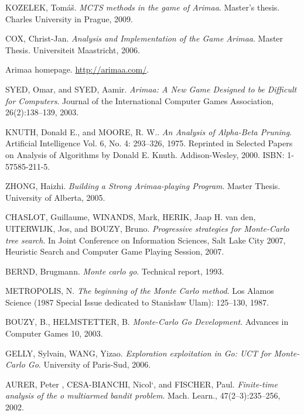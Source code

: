 \def\bibname{Literature}
\begin{thebibliography}{99}
\addcontentsline{toc}{chapter}{\bibname}

	{\sc KOZELEK,} Tomáš.
	\emph{MCTS methods in the game of Arimaa}.
	Master's thesis.
	Charles University in Prague, 2009.

	{\sc COX,} Christ-Jan.
	\emph{Analysis and Implementation of the Game Arimaa}.
	Master Thesis.
	Universiteit Maastricht, 2006.

	Arimaa homepage.
	\url{http://arimaa.com/}.

	{\sc SYED,} Omar, and {\sc SYED,} Aamir.
	\emph{Arimaa: A New Game Designed to be Difficult for Computers}.
	Journal of the International Computer Games Association, 26(2):138--139, 2003.

	{\sc KNUTH,} Donald E., and {\sc MOORE,} R. W..
	\emph{An Analysis of Alpha-Beta Pruning}.
	Artificial Intelligence Vol. 6, No. 4: 293--326, 1975. Reprinted in Selected
	Papers on Analysis of Algorithms by Donald E. Knuth. Addison-Wesley, 2000.
	ISBN: 1-57585-211-5.

	{\sc ZHONG,} Haizhi.
	\emph{Building a Strong Arimaa-playing Program}.
	Master Thesis.
	University of Alberta, 2005.

	{\sc CHASLOT,} Guillaume, {\sc WINANDS,} Mark, {\sc HERIK,} Jaap H. van den,
	{\sc UITERWIJK,} Jos, and {\sc BOUZY,} Bruno.
	\emph{Progressive strategies for Monte-Carlo tree search}.
	In Joint Conference on Information Sciences, Salt Lake City 2007, Heuristic
	Search and Computer Game Playing Session, 2007.

	{\sc BERND,} Brugmann.
	\emph{Monte carlo go}.
	Technical report, 1993.

	{\sc METROPOLIS,} N.
	\emph{The beginning of the Monte Carlo method}.
	Los Alamos Science (1987 Special Issue dedicated to Stanisław Ulam):
	125--130, 1987.

	{\sc BOUZY,} B., {\sc HELMSTETTER,} B.
	\emph{Monte-Carlo Go Development}.
	Advances in Computer Games 10, 2003.

	{\sc GELLY,} Sylvain, {\sc WANG,} Yizao.
	\emph{Exploration exploitation in Go: UCT for Monte-Carlo Go}.
	University of Paris-Sud, 2006.

	{\sc AURER,} Peter , {\sc CESA-BIANCHI,} Nicol`, and {\sc FISCHER,} Paul.
	\emph{Finite-time analysis of the o multiarmed bandit problem}.
	Mach. Learn., 47(2--3):235--256, 2002.


\end{thebibliography}

